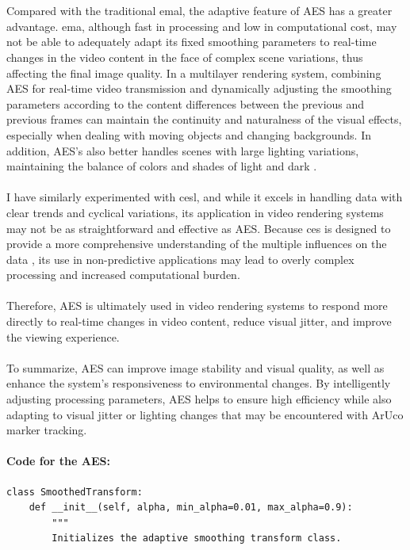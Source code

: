 \documentclass[12pt]{article}
\begin{document}
\begin{enumerate}
\begin{enumerate}
                        \\\\
                        Compared with the traditional \gls{emal}, the adaptive feature of AES has a greater advantage. \gls{ema}, although fast in processing and low in computational cost, may not be able to adequately adapt its fixed smoothing parameters to real-time changes in the video content in the face of complex scene variations, thus affecting the final image quality\cite{aes,aes2,InvestopediaEMA}.
                        In a multilayer rendering system, combining AES for real-time video transmission and dynamically adjusting the smoothing parameters according to the content differences between the previous and previous frames can maintain the continuity and naturalness of the visual effects, especially when dealing with moving objects and changing backgrounds. In addition, AES's also better handles scenes with large lighting variations, maintaining the balance of colors and shades of light and dark \cite{7298776}.
                        \\\\
                        I have similarly experimented with \gls{cesl}, and while it excels in handling data with clear trends and cyclical variations, its application in video rendering systems may not be as straightforward and effective as AES. Because \gls{ces} is designed to provide a more comprehensive understanding of the multiple influences on the data \cite{ComplexES2018,Complex}, its use in non-predictive applications may lead to overly complex processing and increased computational burden.
                        \\\\
                        Therefore, AES is ultimately used in video rendering systems to respond more directly to real-time changes in video content, reduce visual jitter, and improve the viewing experience.
                        \\\\
                        To summarize, AES can improve image stability and visual quality, as well as enhance the system's responsiveness to environmental changes. By intelligently adjusting processing parameters, AES helps to ensure high efficiency while also adapting to visual jitter or lighting changes that may be encountered with ArUco marker tracking.
                        \paragraph{Code for the AES:}
                        \begin{verbatim}
class SmoothedTransform:
    def __init__(self, alpha, min_alpha=0.01, max_alpha=0.9):
        """
        Initializes the adaptive smoothing transform class.
        

\end{verbatim}
\end{enumerate}
\end{enumerate}
\end{document}
